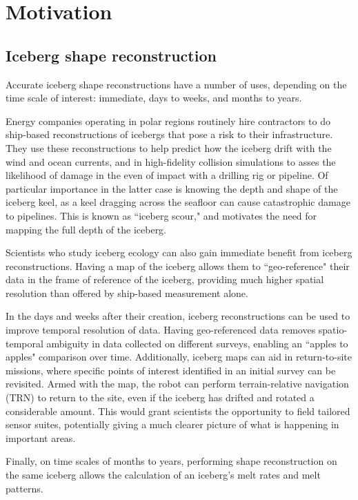 \section{Motivation}

\subsection{Iceberg shape reconstruction}

Accurate iceberg shape reconstructions have a number of uses, depending on the time scale of interest: immediate, days to weeks, and months to years. 

Energy companies operating in polar regions routinely hire contractors to do ship-based reconstructions of icebergs that pose a risk to their infrastructure. They use these reconstructions to help predict how the iceberg drift with the wind and ocean currents, and in high-fidelity collision simulations to asses the likelihood of damage in the even of impact with a drilling rig or pipeline. Of particular importance in the latter case is knowing the depth and shape of the iceberg keel, as a keel dragging across the seafloor can cause catastrophic damage to pipelines. This is known as ``iceberg scour," and motivates the need for mapping the full depth of the iceberg.

Scientists who study iceberg ecology can also gain immediate benefit from iceberg reconstructions. Having a map of the iceberg allows them to ``geo-reference" their data in the frame of reference of the iceberg, providing much higher spatial resolution than offered by ship-based measurement alone.

In the days and weeks after their creation, iceberg reconstructions can be used to improve temporal resolution of data. Having geo-referenced data removes spatio-temporal ambiguity in data collected on different surveys, enabling an ``apples to apples" comparison over time. Additionally, iceberg maps can aid in return-to-site missions, where specific points of interest identified in an initial survey can be revisited. Armed with the map, the robot can perform terrain-relative navigation (TRN) to return to the site, even if the iceberg has drifted and rotated a considerable amount. This would grant scientists the opportunity to field tailored sensor suites, potentially giving a much clearer picture of what is happening in important areas.

Finally, on time scales of months to years, performing shape reconstruction on the same iceberg allows the calculation of an iceberg's melt rates and melt patterns.


